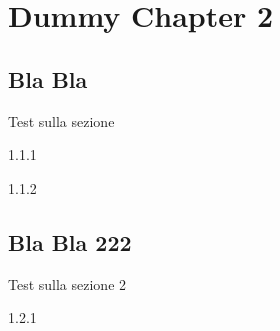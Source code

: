 
\chapter{Dummy Chapter 2}
\label{chp:dummy}

\section{Bla Bla}

Test sulla sezione

\begin{solexe}{1.1.1}
    \lipsum[1]
\end{solexe}

\begin{solexe}{1.1.2}
    \lipsum[3]
\end{solexe}

\section{Bla Bla 222}

Test sulla sezione 2

\begin{solexe}{1.2.1}
    \lipsum[7]
\end{solexe}
